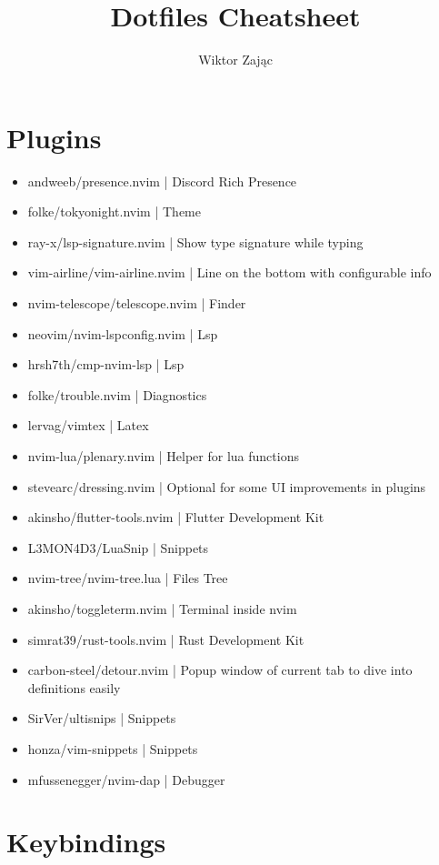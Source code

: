 \documentclass[12pt, a4paper]{article}
\title{Dotfiles Cheatsheet}
\author{Wiktor Zając}
\begin{document}
\maketitle
\vspace{5mm}
\tableofcontents

\section{Plugins}

\begin{itemize}
    \item andweeb/presence.nvim | Discord Rich Presence
    \item folke/tokyonight.nvim | Theme
    \item ray-x/lsp-signature.nvim | Show type signature while typing
    \item vim-airline/vim-airline.nvim | Line on the bottom with configurable info
    \item nvim-telescope/telescope.nvim | Finder
    \item neovim/nvim-lspconfig.nvim | Lsp
    \item hrsh7th/cmp-nvim-lsp | Lsp
    \item folke/trouble.nvim | Diagnostics
    \item lervag/vimtex | Latex
    \item nvim-lua/plenary.nvim | Helper for lua functions
    \item stevearc/dressing.nvim | Optional for some UI improvements in plugins
    \item akinsho/flutter-tools.nvim | Flutter Development Kit
    \item L3MON4D3/LuaSnip | Snippets
    \item nvim-tree/nvim-tree.lua | Files Tree
    \item akinsho/toggleterm.nvim | Terminal inside nvim
    \item simrat39/rust-tools.nvim | Rust Development Kit
    \item carbon-steel/detour.nvim | Popup window of current tab to dive into definitions easily
    \item SirVer/ultisnips | Snippets
    \item honza/vim-snippets | Snippets
    \item mfussenegger/nvim-dap | Debugger
\end{itemize}

\section{Keybindings}
\end{document}
